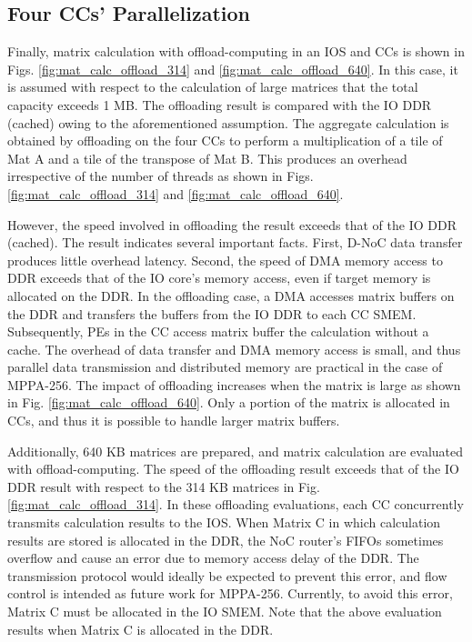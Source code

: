 \subsection{Four CCs' Parallelization}
\label{sec:four_CCs}
Finally, matrix calculation with offload-computing in an IOS and CCs is shown in Figs. \ref{fig:mat_calc_offload_314} and \ref{fig:mat_calc_offload_640}.
In this case, it is assumed with respect to the calculation of large matrices that the total capacity exceeds 1 MB.
The offloading result is compared with the IO DDR (cached) owing to the aforementioned assumption.
The aggregate calculation is obtained by offloading on the four CCs to perform a multiplication of a tile of Mat A and a tile of the transpose of Mat B.
This produces an overhead irrespective of the number of threads as shown in Figs. \ref{fig:mat_calc_offload_314} and \ref{fig:mat_calc_offload_640}.

However, the speed involved in offloading the result exceeds that of the IO DDR (cached).
The result indicates several important facts.
First, D-NoC data transfer produces little overhead latency.
Second, the speed of DMA memory access to DDR exceeds that of the IO core's memory access, even if target memory is allocated on the DDR.
In the offloading case, a DMA accesses matrix buffers on the DDR and transfers the buffers from the IO DDR to each CC SMEM.
Subsequently, PEs in the CC access matrix buffer the calculation without a cache.
The overhead of data transfer and DMA memory access is small, and thus parallel data transmission and distributed memory are practical in the case of MPPA-256.
The impact of offloading increases when the matrix is large as shown in Fig. \ref{fig:mat_calc_offload_640}.
Only a portion of the matrix is allocated in CCs, and thus it is possible to handle larger matrix buffers.

Additionally, 640 KB matrices are prepared, and matrix calculation are evaluated with offload-computing.
The speed of the offloading result exceeds that of the IO DDR result with respect to the 314 KB matrices in Fig. \ref{fig:mat_calc_offload_314}.
In these offloading evaluations, each CC concurrently transmits calculation results to the IOS.
When Matrix C in which calculation results are stored is allocated in the DDR, the NoC router's FIFOs sometimes overflow and cause an error due to memory access delay of the DDR.
The transmission protocol would ideally be expected to prevent this error, and flow control is intended as future work for MPPA-256.
Currently, to avoid this error, Matrix C must be allocated in the IO SMEM.
Note that the above evaluation results when Matrix C is allocated in the DDR.



